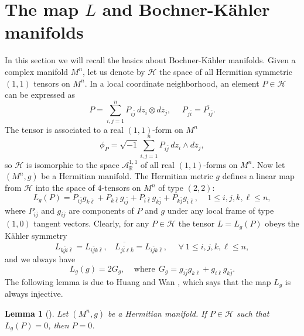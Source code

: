 \documentclass{amsart}
\newtheorem{lemma}{Lemma}
\numberwithin{equation}{section}
\begin{document}
\vspace{0.3cm}

\section{The map $L$ and Bochner-K\"ahler manifolds}

In this section we will recall the basics about Bochner-K\"ahler manifolds. Given a complex manifold $M^n$, let us denote by ${\mathcal H}$ the space of all Hermitian symmetric $(1,1)$ tensors on $M^n$. In a local coordinate neighborhood, an element $P \in {\mathcal H}$ can be expressed as
$$ P = \sum_{i,j=1}^n P_{i\bar{j}} \,dz_i \otimes d\overline{z}_j, \ \ \ \ \ \ P_{j\bar{i}} = \overline{P_{i\bar{j}}}.  $$
The tensor is associated to a real $(1,1)$-form on $M^n$
$$ \phi_P = \sqrt{-1}\sum_{i,j=1}^n P_{i\bar{j}} \,dz_i \wedge d\overline{z}_j,$$
so ${\mathcal H}$ is isomorphic to the space ${\mathcal A}^{1,1}_{\mathbb R}$ of all real $(1,1)$-forms on $M^n$. Now let $(M^n,g)$ be a Hermitian manifold. The Hermitian metric $g$ defines a linear map from ${\mathcal H}$ into the space of $4$-tensors on $M^n$ of type $(2,2)$:
\begin{equation} \label{eq:Ldef}
L_g (P) = P_{i\bar{j}} g_{k\bar{\ell}} +  P_{k\bar{\ell}} g_{i\bar{j}} + P_{i\bar{\ell}} g_{k\bar{j}} + P_{k\bar{j}} g_{i\bar{\ell}}, \ \ \ \ \ 1\leq i,j,k,\ell \leq n,
\end{equation}
where $P_{i\bar{j}}$ and $g_{i\bar{j}}$ are components of $P$ and $g$ under any local frame of type $(1,0)$ tangent vectors. Clearly, for any $P\in {\mathcal H}$ the tensor $L=L_g(P)$ obeys the K\"ahler symmetry
\begin{equation}
 L_{k\bar{j}i\bar{\ell}} = L_{i\bar{j}k\bar{\ell}} , \ \ \ \ \overline{L_{j\bar{i}\ell \bar{k}}} =L_{i\bar{j}k\bar{\ell}}, \ \ \ \ \ \ \forall \ 1\leq i,j,k,\ell \leq n,
 \end{equation}
and we always have
\begin{equation}
L_g(g)=2G_g, \ \ \ \ \ \mbox{where} \ \ G_g = g_{i\bar{j}} g_{k\bar{\ell}} + g_{i\bar{\ell}} g_{k\bar{j}}.
 \end{equation}
The following lemma is due to Huang and Wan \cite[Lemma 3.1]{HW}, which says that the map $L_g$ is always injective.
\begin{lemma}[\cite{HW}] \label{lemma-injective}
Let $(M^n,g)$ be a Hermitian manifold. If $P\in {\mathcal H}$ such that $L_g(P)=0$, then $P=0$. \end{lemma}
\end{document}
